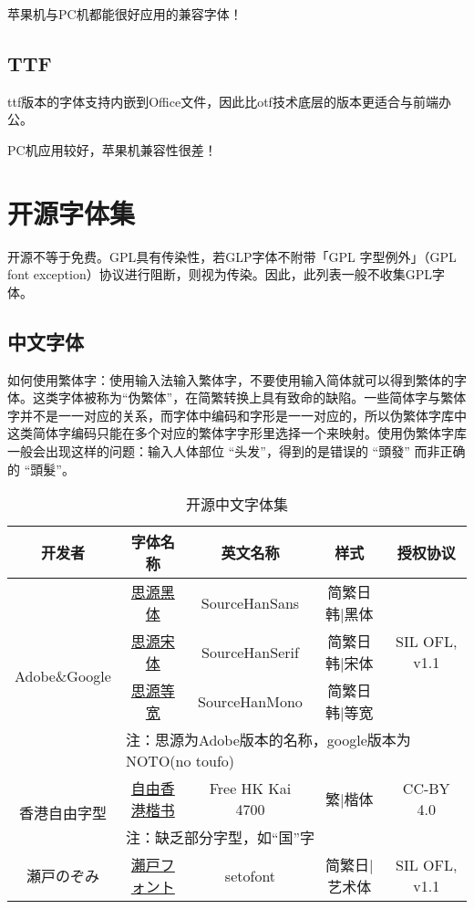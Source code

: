 \documentclass{../../PublicResources/DocClass}
\begin{document}
    苹果机与PC机都能很好应用的兼容字体！

    \section{TTF}
    ttf版本的字体支持内嵌到Office文件，因此比otf技术底层的版本更适合与前端办公。

    PC机应用较好，苹果机兼容性很差！

    \chapter{开源字体集}
    开源不等于免费。GPL具有传染性，若GLP字体不附带「GPL 字型例外」（GPL font exception）协议进行阻断，则视为传染。因此，此列表一般不收集GPL字体。


    \section{中文字体}
    如何使用繁体字：使用输入法输入繁体字，不要使用输入简体就可以得到繁体的字体。这类字体被称为“伪繁体”，在简繁转换上具有致命的缺陷。一些简体字与繁体字并不是一一对应的关系，而字体中编码和字形是一一对应的，所以伪繁体字库中这类简体字编码只能在多个对应的繁体字字形里选择一个来映射。使用伪繁体字库一般会出现这样的问题：输入人体部位 “头发”，得到的是错误的 “頭發” 而非正确的 “頭髮”。

    \begin{table}[h]
        \centering \caption{开源中文字体集}
        \begin{tabular}{|*{5}{c|}}
            \hline
            开发者 & 字体名称 & 英文名称 & 样式 & 授权协议 \\
            \hline
            \multirow{4}{*}{Adobe\&Google} & \href{https://github.com/adobe-fonts/source-han-sans/tree/release/}{思源黑体} & SourceHanSans & 简繁日韩|黑体 & \multirow{3}{*}{SIL OFL, v1.1} \\
            \cline{2-4}
            & \href{https://github.com/adobe-fonts/source-han-serif/tree/release/}{思源宋体} & SourceHanSerif & 简繁日韩|宋体 & \\
            \cline{2-4}
            & \href{https://github.com/adobe-fonts/source-han-mono}{思源等宽} & SourceHanMono & 简繁日韩|等宽 & \\
            \cline{2-5}
            & \multicolumn{4}{l|}{注：思源为Adobe版本的名称，google版本为NOTO(no toufo)} \\
            \hline
            \multirow{2}{*}{香港自由字型} & \href{https://freehkfonts.opensource.hk/download/}{自由香港楷书} & Free HK Kai 4700 & 繁|楷体 & CC-BY 4.0 \\
            \cline{2-5}
            & \multicolumn{4}{l|}{注：缺乏部分字型，如“国”字} \\
            \hline
            瀬戸のぞみ & \href{https://osdn.net/projects/setofont/}{瀨戸フォント} & setofont & 简繁日|艺术体 & SIL OFL, v1.1 \\
            \hline
        \end{tabular}
    \end{table}
\end{document}

